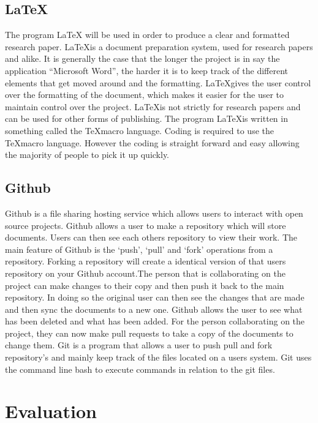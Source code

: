 \documentclass[11pt,a4paper]{report}
\begin{document}
\section{ \LaTeX}
\label{sec:LaTeX}
The program LaTeX will be used in order to produce a clear and formatted research paper. \LaTeX\space is a document preparation system, used for research papers and alike. It is generally the case that the longer the project is in say the application “Microsoft Word”, the harder it is to keep track of the different elements that get moved around and the formatting. \LaTeX\space gives the user control over the formatting of the document, which makes it easier for the user to maintain control over the project. \LaTeX\space is not strictly for research papers and can be used for other forms of publishing. The program \LaTeX\space is written in something called the \TeX\space macro language. Coding is required to use the \TeX\space macro language. However the coding is straight forward and easy allowing the majority of people to pick it up quickly.

\section{Github}
\label{sec:Git}
Github is a file sharing hosting service which allows users to interact with open source projects. Github allows a user to make a repository which will store documents. Users can then see each others repository to view their work. The main feature of Github is the `push', `pull' and `fork' operations from a repository. Forking a repository will create a identical version of that users repository on your Github account.The person that is collaborating on the project can make changes to their copy and then push it back to the main repository. In doing so the original user can then see the changes that are made and then sync the documents to a new one. Github allows the user to see what has been deleted and what has been added. For the person collaborating on the project, they can now make pull requests to take a copy of the documents to change them.
Git is a program that allows a user to push pull and fork repository's and mainly keep track of the files located on a users system. Git uses the command line bash to execute commands in relation to the git files.


\chapter{Evaluation}
\label{cha:Eval}
\end{document}
